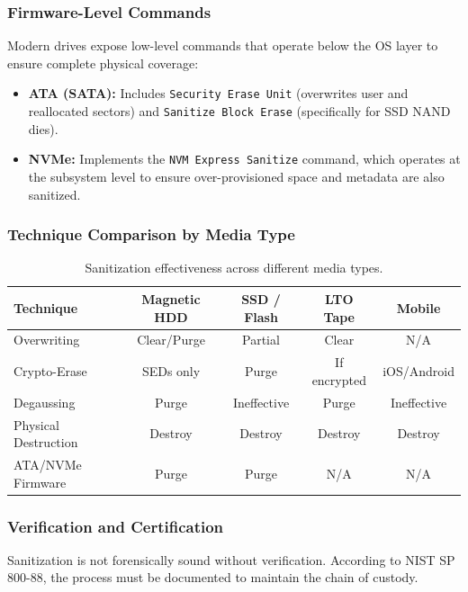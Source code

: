 \subsubsection*{Firmware-Level Commands}
Modern drives expose low-level commands that operate below the OS layer to ensure complete physical coverage:
\begin{itemize}
    \item \textbf{ATA (SATA):} Includes \texttt{Security Erase Unit} (overwrites user and reallocated sectors) and \texttt{Sanitize Block Erase} (specifically for SSD NAND dies).
    \item \textbf{NVMe:} Implements the \texttt{NVM Express Sanitize} command, which operates at the subsystem level to ensure over-provisioned space and metadata are also sanitized.
\end{itemize}

\subsubsection*{Technique Comparison by Media Type}
\begin{table}[H]
\centering
\small
\begin{tabular}{|l|c|c|c|c|}
\hline
\textbf{Technique} & \textbf{Magnetic HDD} & \textbf{SSD / Flash} & \textbf{LTO Tape} & \textbf{Mobile} \\
\hline
Overwriting & Clear/Purge & Partial & Clear & N/A \\
Crypto-Erase & SEDs only & Purge & If encrypted & iOS/Android \\
Degaussing & Purge & Ineffective & Purge & Ineffective \\
Physical Destruction & Destroy & Destroy & Destroy & Destroy \\
ATA/NVMe Firmware & Purge & Purge & N/A & N/A \\
\hline
\end{tabular}
\caption{Sanitization effectiveness across different media types.}
\end{table}

\subsubsection*{Verification and Certification}
Sanitization is not forensically sound without verification. According to NIST SP 800-88, the process must be documented to maintain the chain of custody.

